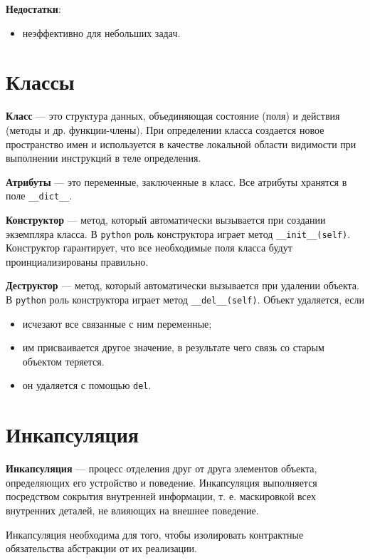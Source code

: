 \documentclass[a4paper,12pt,oneside]{extbook}
\begin{document}
\textbf{Недостатки}:
\begin{itemize}
    \item неэффективно для небольших задач.
\end{itemize}

\section{Классы}%
\label{sec:Классы}

\textbf{Класс} — это структура данных, объединяющая состояние (поля) и действия (методы и др. функции-члены). При определении класса создается новое пространство имен и используется в качестве локальной области видимости при выполнении инструкций в теле определения.

\textbf{Атрибуты} — это переменные, заключенные в класс. Все атрибуты хранятся в поле \texttt{\_\_dict\_\_}.

\textbf{Конструктор} — метод, который автоматически вызывается при создании экземпляра класса. В \texttt{python} роль конструктора играет метод \texttt{\_\_init\_\_(self)}. Конструктор гарантирует, что все необходимые поля класса будут проинциализированы правильно.

\textbf{Деструктор} — метод, который автоматически вызывается при удалении объекта. В \texttt{python} роль конструктора играет метод \texttt{\_\_del\_\_(self)}. Объект удаляется, если
\begin{itemize}
    \item исчезают все связанные с ним переменные;
    \item им присваивается другое значение, в результате чего связь со старым объектом теряется.
    \item он удаляется с помощью \texttt{del}.
\end{itemize}

\section{Инкапсуляция}%
\label{sec:Инкапсуляция}

\textbf{Инкапсуляция} — процесс отделения друг от друга элементов объекта, определяющих его устройство и поведение. Инкапсуляция выполняется посредством сокрытия внутренней информации, т. е. маскировкой всех внутренних деталей, не влияющих на внешнее поведение.

Инкапсуляция необходима для того, чтобы изолировать контрактные обязательства абстракции от их реализации.
\end{document}

